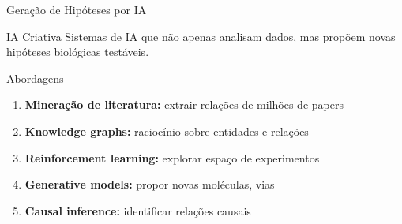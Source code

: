 \begin{frame}{Geração de Hipóteses por IA}
\begin{block}{IA Criativa}
Sistemas de IA que não apenas analisam dados, mas propõem novas hipóteses biológicas testáveis.
\end{block}

\vspace{0.3cm}

\begin{exampleblock}{Abordagens}
\begin{enumerate}
    \item \textbf{Mineração de literatura:} extrair relações de milhões de papers
    \item \textbf{Knowledge graphs:} raciocínio sobre entidades e relações
    \item \textbf{Reinforcement learning:} explorar espaço de experimentos
    \item \textbf{Generative models:} propor novas moléculas, vias
    \item \textbf{Causal inference:} identificar relações causais
\end{enumerate}
\end{exampleblock}

\vspace{0.3cm}

\end{frame}

